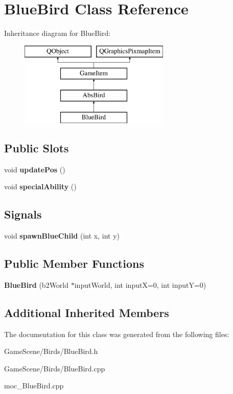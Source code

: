 \hypertarget{classBlueBird}{}\section{Blue\+Bird Class Reference}
\label{classBlueBird}
Inheritance diagram for Blue\+Bird\+:\begin{figure}[H]
\begin{center}
\leavevmode
\includegraphics[height=4.000000cm]{classBlueBird}
\end{center}
\end{figure}
\subsection*{Public Slots}
\begin{DoxyCompactItemize}
\item 
void {\bfseries update\+Pos} ()\hypertarget{classBlueBird_a07d51f73da430f56019e507a2b575f62}{}\label{classBlueBird_a07d51f73da430f56019e507a2b575f62}

\item 
void {\bfseries special\+Ability} ()\hypertarget{classBlueBird_afc51650104f6d4572d05d1624e529a1e}{}\label{classBlueBird_afc51650104f6d4572d05d1624e529a1e}

\end{DoxyCompactItemize}
\subsection*{Signals}
\begin{DoxyCompactItemize}
\item 
void {\bfseries spawn\+Blue\+Child} (int x, int y)\hypertarget{classBlueBird_aa4e5f4ce6da8d99c42a10c1cadd2d91c}{}\label{classBlueBird_aa4e5f4ce6da8d99c42a10c1cadd2d91c}

\end{DoxyCompactItemize}
\subsection*{Public Member Functions}
\begin{DoxyCompactItemize}
\item 
{\bfseries Blue\+Bird} (b2\+World $\ast$input\+World, int inputX=0, int inputY=0)\hypertarget{classBlueBird_a8ed2396b0182e8985500d5c672fa3f80}{}\label{classBlueBird_a8ed2396b0182e8985500d5c672fa3f80}

\end{DoxyCompactItemize}
\subsection*{Additional Inherited Members}


The documentation for this class was generated from the following files\+:\begin{DoxyCompactItemize}
\item 
Game\+Scene/\+Birds/Blue\+Bird.\+h\item 
Game\+Scene/\+Birds/Blue\+Bird.\+cpp\item 
moc\+\_\+\+Blue\+Bird.\+cpp\end{DoxyCompactItemize}
